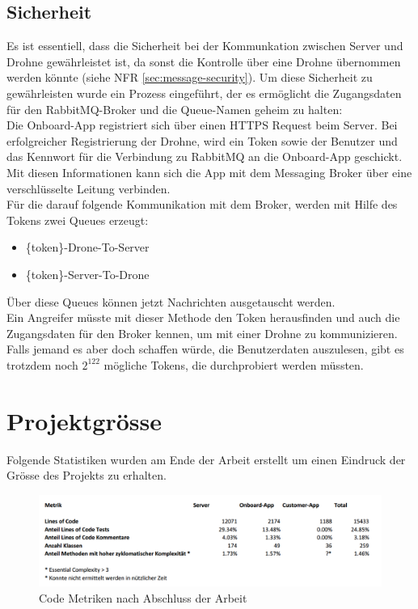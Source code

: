 \subsection{Sicherheit}
Es ist essentiell, dass die Sicherheit bei der Kommunkation zwischen Server und Drohne gewährleistet ist, da sonst die Kontrolle über eine Drohne übernommen werden könnte (siehe NFR \ref{sec:message-security}). Um diese Sicherheit zu gewährleisten wurde ein Prozess eingeführt, der es ermöglicht die Zugangsdaten für den RabbitMQ-Broker und die Queue-Namen geheim zu halten: \\

Die Onboard-App registriert sich über einen HTTPS Request beim Server. Bei erfolgreicher Registrierung der Drohne, wird ein Token sowie der Benutzer und das Kennwort für die Verbindung zu RabbitMQ an die Onboard-App geschickt. Mit diesen Informationen kann sich die App mit dem Messaging Broker über eine verschlüsselte Leitung verbinden.\\

Für die darauf folgende Kommunikation mit dem Broker, werden mit Hilfe des Tokens zwei Queues erzeugt: 
\begin{itemize}
	\item \{token\}-Drone-To-Server
	\item  \{token\}-Server-To-Drone
\end{itemize}

Über diese Queues können jetzt Nachrichten ausgetauscht werden. \\

Ein Angreifer müsste mit dieser Methode den Token herausfinden und auch die Zugangsdaten für den Broker kennen, um mit einer Drohne zu kommunizieren. Falls jemand es aber doch schaffen würde, die Benutzerdaten auszulesen, gibt es trotzdem noch $2^{122}$ mögliche Tokens, die durchprobiert werden müssten. \\

\section{Projektgrösse}

Folgende Statistiken wurden am Ende der Arbeit erstellt um einen Eindruck der Grösse des Projekts zu erhalten.\\

\begin{figure}[H]
	\centering
	\includegraphics[width=1.0\textwidth] {images/code-metrics.png}
	\caption{Code Metriken nach Abschluss der Arbeit}
	\label{fig:code-metrics}
\end{figure}

